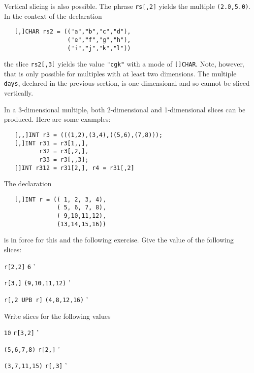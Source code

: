 Vertical slicing is also possible. The phrase \verb|rs[,2]| yields
the multiple \verb|(2.0,5.0)|. In the context of the declaration
\begin{verbatim}
   [,]CHAR rs2 = (("a","b","c","d"),
                  ("e","f","g","h"),
                  ("i","j","k","l"))
\end{verbatim}
\noindent
the slice \verb|rs2[,3]| yields the value \verb|"cgk"| with a mode of
\verb|[]CHAR|. Note, however, that  is only
possible for multiples with at least two dimensions.  The multiple
\verb|days|, declared in the previous section, is one-dimensional and
so cannot be sliced vertically.

In a 3-dimensional multiple, both 2-dimensional and 1-dim\-en\-sional
slices can be produced. Here are some examples:
\begin{verbatim}
   [,,]INT r3 = (((1,2),(3,4),((5,6),(7,8)));
   [,]INT r31 = r3[1,,],
          r32 = r3[,2,],
          r33 = r3[,,3];
   []INT r312 = r31[2,], r4 = r31[,2]
\end{verbatim}

\begin{exercise}
\item The declaration
\begin{verbatim}
   [,]INT r = (( 1, 2, 3, 4),
               ( 5, 6, 7, 8),
               ( 9,10,11,12),
               (13,14,15,16))
\end{verbatim}
\noindent
is in force for this and the following exercise.  Give the value of
the following slices:
\begin{subex}
\item \verb|r[2,2]| \subans \verb|6|
'
\item \verb|r[3,]| \subans \verb|(9,10,11,12)|
'
\item \verb|r[,2 UPB r]| \subans \verb|(4,8,12,16)|
'
\end{subex}
\item Write slices for the following values
\begin{subex}
\item \verb|10| \subans \verb|r[3,2]|
'
\item \verb|(5,6,7,8)| \subans \verb|r[2,]|
'
\item \verb|(3,7,11,15)| \subans \verb|r[,3]|
'
\end{subex}
\end{exercise}

